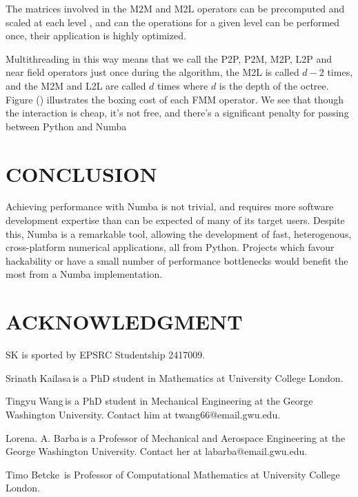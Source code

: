 \documentclass{IEEEcsmag}
\begin{document}
The matrices involved in the M2M and M2L operators can be precomputed and scaled at each level \cite{Wang2021}, and can the operations for a given level can be performed once, their application is highly optimized.

Multithreading in this way means that we call the P2P, P2M, M2P, L2P and near field operators just once during the algorithm, the M2L is called $d-2$ times, and the M2M and L2L are called $d$ times where $d$ is the depth of the octree. Figure () illustrates the boxing cost of each FMM operator. We see that though the interaction is cheap, it's not free, and there's a significant penalty for passing between Python and Numba

\section{CONCLUSION}

Achieving performance with Numba is not trivial, and requires more software development expertise than can be expected of many of its target users. Despite this, Numba is a remarkable tool, allowing the development of fast, heterogenous, cross-platform numerical applications, all from Python. Projects which favour hackability or have a small number of performance bottlenecks would benefit the most from a Numba implementation.

\section{ACKNOWLEDGMENT}

SK is sported by EPSRC Studentship 2417009.





\begin{IEEEbiography}{Srinath Kailasa}{\,}is a PhD student in Mathematics at University College London.
\end{IEEEbiography}

\begin{IEEEbiography}{Tingyu Wang}{\,}is a PhD student in Mechanical Engineering at the George Washington University. Contact him at twang66@email.gwu.edu.
\end{IEEEbiography}

\begin{IEEEbiography}{Lorena. A. Barba}{\,}is a Professor of Mechanical and Aerospace Engineering at the George Washington University.  Contact her at labarba@email.gwu.edu.
\end{IEEEbiography}

\begin{IEEEbiography}{Timo Betcke}{\,} is Professor of Computational Mathematics at University College London.
\end{IEEEbiography}
\end{document}
